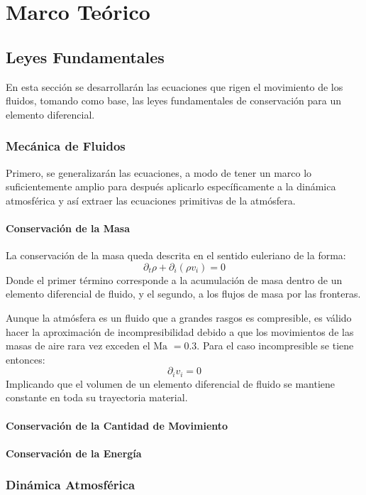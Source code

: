 \chapter{Marco Teórico}
\section{Leyes Fundamentales}
En esta sección se desarrollarán las ecuaciones que rigen el movimiento de los fluidos, tomando como base, las leyes fundamentales de conservación para un elemento diferencial.
\subsection{Mecánica de Fluidos}
Primero, se generalizarán las ecuaciones, a modo de tener un marco lo suficientemente amplio para después aplicarlo específicamente a la dinámica atmosférica y así extraer las ecuaciones primitivas de la atmósfera.
\subsubsection{Conservación de la Masa}
La conservación de la masa queda descrita en el sentido euleriano de la forma:
\begin{equation}
\partial_t \rho + \partial_i(\rho v_i) = 0
\end{equation}
Donde el primer término corresponde a la acumulación de masa dentro de un elemento diferencial de fluido, y el segundo, a los flujos de masa por las fronteras.

Aunque la atmósfera es un fluido que a grandes rasgos es compresible, es válido hacer la aproximación de incompresibilidad debido a que los movimientos de las masas de aire rara vez exceden el $\text{Ma }=0.3$. Para el caso incompresible se tiene entonces:
\begin{equation}
\partial_i v_i =0
\end{equation}
Implicando que el volumen de un elemento diferencial de fluido se mantiene constante en toda su trayectoria material.
\subsubsection{Conservación de la Cantidad de Movimiento}
\subsubsection{Conservación de la Energía}
\subsection{Dinámica Atmosférica}
